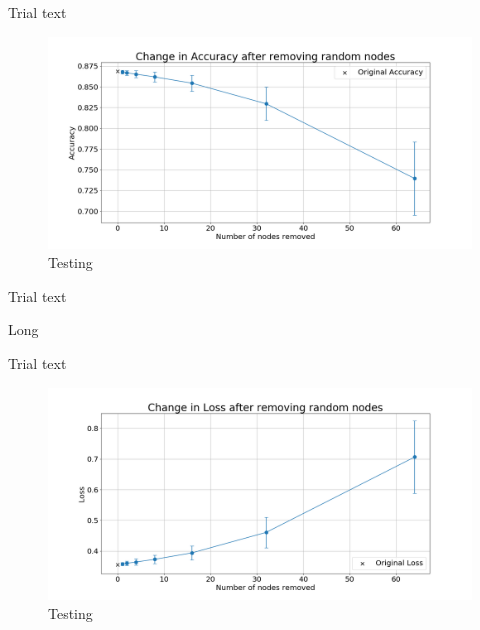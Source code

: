 \documentclass[UKenglish]{ifimaster}
\begin{document}
            Trial text

            \begin{figure}[h!]\centering
                \includegraphics[width=\textwidth]{Accuracy_change_random_removal_fmnist.png}
                \caption[Short title]{Testing}
                \label{fig:acc_rn_fmnist}
            \end{figure}

            Trial text

            \begin{table}[h!]
                \centering
                \resizebox{\textwidth}{!}{}
                \caption[Short]{Long}
                \label{tab:loss_rnd_rem_fmnist}
            \end{table}

            Trial text

            \begin{figure}[h!]\centering
                \includegraphics[width=\textwidth]{Loss_change_random_removal_fmnist.png}
                \caption[Short title]{Testing}
                \label{fig:loss_rn_fmnist}
            \end{figure}
\end{document}
